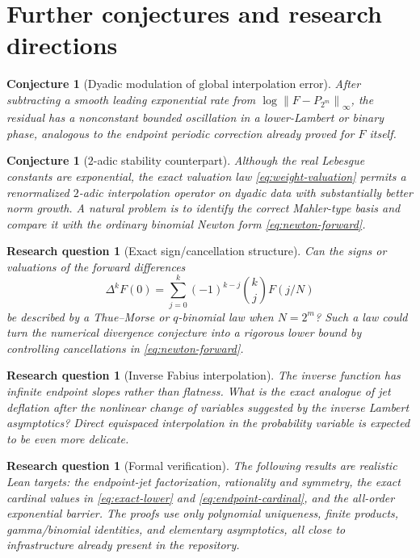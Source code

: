 \documentclass[11pt,oneside]{article}
\newtheorem{conjecture}[theorem]{Conjecture}
\newtheorem{question}[theorem]{Research question}
\theoremstyle{definition}
\theoremstyle{remark}
\newcommand{\norm}[1]{\left\lVert #1\right\rVert}
\begin{document}
\section{Further conjectures and research directions}
\label{sec:future}

\begin{conjecture}[Dyadic modulation of global interpolation error]
After subtracting a smooth leading exponential rate from $\log\norm{F-P_{2^m}}_\infty$, the residual has a nonconstant bounded oscillation in a lower-Lambert or binary phase, analogous to the endpoint periodic correction already proved for $F$ itself.
\end{conjecture}

\begin{conjecture}[$2$-adic stability counterpart]
Although the real Lebesgue constants are exponential, the exact valuation law \eqref{eq:weight-valuation} permits a renormalized $2$-adic interpolation operator on dyadic data with substantially better norm growth.  A natural problem is to identify the correct Mahler-type basis and compare it with the ordinary binomial Newton form \eqref{eq:newton-forward}.
\end{conjecture}

\begin{question}[Exact sign/cancellation structure]
Can the signs or valuations of the forward differences
\begin{equation}
 \Delta^kF(0)=\sum_{j=0}^{k}(-1)^{k-j}\binom kjF(j/N)
\end{equation}
be described by a Thue--Morse or $q$-binomial law when $N=2^m$?  Such a law could turn the numerical divergence conjecture into a rigorous lower bound by controlling cancellations in \eqref{eq:newton-forward}.
\end{question}

\begin{question}[Inverse Fabius interpolation]
The inverse function has infinite endpoint slopes rather than flatness.  What is the exact analogue of jet deflation after the nonlinear change of variables suggested by the inverse Lambert asymptotics?  Direct equispaced interpolation in the probability variable is expected to be even more delicate.
\end{question}

\begin{question}[Formal verification]
The following results are realistic Lean targets: the endpoint-jet factorization, rationality and symmetry, the exact cardinal values in \eqref{eq:exact-lower} and \eqref{eq:endpoint-cardinal}, and the all-order exponential barrier.  The proofs use only polynomial uniqueness, finite products, gamma/binomial identities, and elementary asymptotics, all close to infrastructure already present in the repository.
\end{question}
\end{document}
